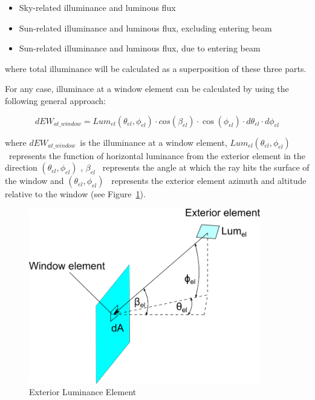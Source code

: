 \begin{itemize}
\item
  Sky-related illuminance and luminous flux
\item
  Sun-related illuminance and luminous flux, excluding entering beam
\item
  Sun-related illuminance and luminous flux, due to entering beam
\end{itemize}

where total illuminance will be calculated as a superposition of these three parts.

For any case, illuminace at a window element can be calculated by using the following general approach:

\begin{equation}
dE{W_{at\_window}} = Lu{m_{el}}({\theta_{el}},{\phi_{el}}) \cdot cos({\beta_{el}}) \cdot \cos ({\phi_{el}}) \cdot d{\theta_{el}} \cdot d{\phi_{el}}
\label{eq:IlluminanceAtWindowElement}
\end{equation}

where \(dE{W_{at\_window}}\)~is the illuminance at a window element, \(Lu{m_{el}}({\theta_{el}},{\phi_{el}})\)~represents the function of horizontal luminance from the exterior element in the direction \(({\theta_{el}},{\phi_{el}})\) , \({\beta_{el}}\) ~represents the angle at which the ray hits the surface of the window and \(({\theta_{el}},{\phi_{el}})\) ~represents the exterior element azimuth and altitude relative to the window (see Figure~\ref{fig:exterior-luminance-element}).

\begin{figure}[hbtp] %
\centering
\includegraphics[width=0.9\textwidth, height=0.9\textheight, keepaspectratio=true]{media/image834.png}
\caption{Exterior Luminance Element \protect \label{fig:exterior-luminance-element}}
\end{figure}

